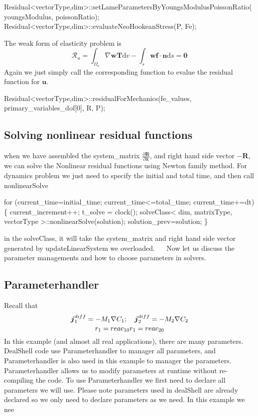 \begin{DoxyCode}
Residual<vectorType,dim>::setLameParametersByYoungsModulusPoissonRatio(youngsModulus, poissonRatio);
Residual<vectorType,dim>::evaluateNeoHookeanStress(P, Fe);
\end{DoxyCode}
 The weak form of elasticity problem is \[ \mathscr{R}_u=\int_{\Omega_{\text{e}}}\nabla \boldsymbol{w}\boldsymbol{T} \text{d}v- \int_{s}\boldsymbol{w} \boldsymbol{f} \cdot \boldsymbol{n} \text{d}s = \boldsymbol{0} \] Again we just simply call the corresponding function to evalue the residual function for $\boldsymbol{u}$. 
\begin{DoxyCode}
Residual<vectorType,dim>::residualForMechanics(fe\_values, primary\_variables\_dof[0], R, P);
\end{DoxyCode}
\hypertarget{_intercalation_solve}{}\subsection{Solving nonlinear residual functions}\label{_intercalation_solve}
when we have assembled the system\+\_\+matrix $\frac{\partial \boldsymbol{R}}{\partial \boldsymbol{x}} $, and right hand side vector $-\boldsymbol{R}$, we can solve the Nonlinear residual functions using Newton family method. For dynamics problem we just need to specify the initial and total time, and then call {\ttfamily nonlinear\+Solve} 
\begin{DoxyCode}
 \textcolor{keywordflow}{for} (current\_time=initial\_time; current\_time<=total\_time; current\_time+=dt)\{
   current\_increment++;
   t\_solve = clock();
       solveClass< dim, matrixType, vectorType >::nonlinearSolve(solution);
       solution\_prev=solution;
\}
\end{DoxyCode}
 in the {\ttfamily solve\+Class}, it will take the system\+\_\+matrix and right hand side vector generated by {\ttfamily update\+Linear\+System} we overloaded.~\newline
 ~\newline
 Now let us discuss the parameter managements and how to choose parameters in solvers. \hypertarget{_intercalation_parameter}{}\subsection{Parameterhandler}\label{_intercalation_parameter}
Recall that \[ \boldsymbol{j}_1^{diff}=-M_1\nabla C_\text{1}; \quad \boldsymbol{j}_2^{diff}=-M_2\nabla C_\text{2}\\ \] \[ r_1= reac_{10} \\ r_1= reac_{20} \] In this example (and almost all real applications), there are many parameters. Deal\+Shell code use {\ttfamily Parameterhandler} to manager all parameters, and {\ttfamily Parameterhandler} is also used in this example to manager the parameters. {\ttfamily Parameterhandler} allows us to modify parameters at runtime without re-\/compiling the code. To use {\ttfamily Parameterhandler} we first need to declare all parameters we will use. Please note parameters used in deal\+Shell are already declared so we only need to declare parameters as we need. In this example we nee 

